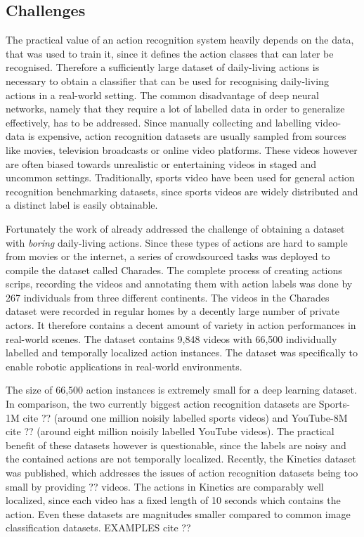 \subsection{Challenges}
The practical value of an action recognition system heavily depends on the data, that was used to train it, since it defines the action classes that can later be recognised.
Therefore a sufficiently large dataset of daily-living actions is necessary to obtain a classifier that can be used for recognising daily-living actions in a real-world setting.
The common disadvantage of deep neural networks, namely that they require a lot of labelled data in order to generalize effectively, has to be addressed.
Since manually collecting and labelling video-data is expensive, action recognition datasets are usually sampled from sources like movies, television broadcasts or online video platforms.
These videos however are often biased towards unrealistic or entertaining videos in staged and uncommon settings.
Traditionally, sports video have been used for general action recognition benchmarking datasets, since sports videos are widely distributed and a distinct label is easily obtainable.

Fortunately the work of \textcite{sigurdsson_hollywood_2016} already addressed the challenge of obtaining a dataset with \textit{boring} daily-living actions.
Since these types of actions are hard to sample from movies or the internet, a series of crowdsourced tasks was deployed to compile the dataset called Charades\textcite{sigurdsson_hollywood_2016}.
The complete process of creating actions scrips, recording the videos and annotating them with action labels was done by 267 individuals from three different continents.
The videos in the Charades dataset were recorded in regular homes by a decently large number of private actors.
It therefore contains a decent amount of variety in action performances in real-world scenes.
The dataset contains 9,848 videos with 66,500 individually labelled and temporally localized action instances.
The dataset was specifically to enable robotic applications in real-world environments.

The size of 66,500 action instances is extremely small for a deep learning dataset.
In comparison, the two currently biggest action recognition datasets are Sports-1M cite ?? (around one million noisily labelled sports videos) and YouTube-8M cite ?? (around eight million noisily labelled YouTube videos).
The practical benefit of these datasets however is questionable, since the labels are noisy and the contained actions are not temporally localized.
Recently, the Kinetics dataset was published, which addresses the issues of action recognition datasets being too small by providing ?? videos.
The actions in Kinetics are comparably well localized, since each video has a fixed length of 10 seconds which contains the action.
Even these datasets are magnitudes smaller compared to common image classification datasets.
EXAMPLES cite ??

